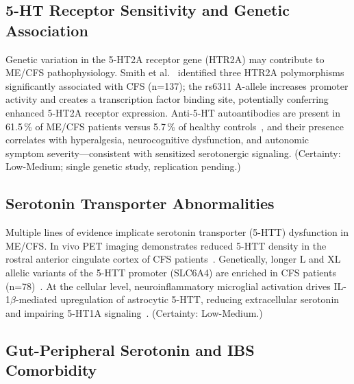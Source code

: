 \subsection{5-HT Receptor Sensitivity and Genetic Association}

\begin{hypothesis}
\label{hyp:ch15-5ht2a-upregulation}
Genetic variation in the 5-HT2A receptor gene (HTR2A) may contribute to ME/CFS pathophysiology. Smith et al.~\cite{Smith2008HTR2A} identified three HTR2A polymorphisms significantly associated with CFS (n=137); the rs6311 A-allele increases promoter activity and creates a transcription factor binding site, potentially conferring enhanced 5-HT2A receptor expression. Anti-5-HT autoantibodies are present in 61.5\,\% of ME/CFS patients versus 5.7\,\% of healthy controls~\cite{Maes2013serotonin}, and their presence correlates with hyperalgesia, neurocognitive dysfunction, and autonomic symptom severity---consistent with sensitized serotonergic signaling. (Certainty: Low-Medium; single genetic study, replication pending.)
\end{hypothesis}

\subsection{Serotonin Transporter Abnormalities}

\begin{observation}
\label{obs:ch15-serotonin-transporter}
Multiple lines of evidence implicate serotonin transporter (5-HTT) dysfunction in ME/CFS. In vivo PET imaging demonstrates reduced 5-HTT density in the rostral anterior cingulate cortex of CFS patients~\cite{Yamamoto2004serotonin}. Genetically, longer L and XL allelic variants of the 5-HTT promoter (SLC6A4) are enriched in CFS patients (n=78)~\cite{Narita2003transporter}. At the cellular level, neuroinflammatory microglial activation drives IL-1$\beta$-mediated upregulation of astrocytic 5-HTT, reducing extracellular serotonin and impairing 5-HT1A signaling~\cite{Noda2018glial}. (Certainty: Low-Medium.)
\end{observation}

\subsection{Gut-Peripheral Serotonin and IBS Comorbidity}

